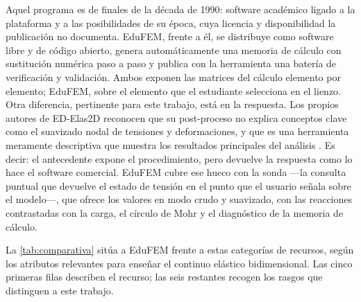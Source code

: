 Aquel programa es de finales de la década de 1990: software académico ligado a la plataforma y a las posibilidades de su época, cuya licencia y disponibilidad la publicación no documenta. EduFEM, frente a él, se distribuye como software libre y de código abierto, genera automáticamente una memoria de cálculo con sustitución numérica paso a paso y publica con la herramienta una batería de verificación y validación. Ambos exponen las matrices del cálculo elemento por elemento; EduFEM, sobre el elemento que el estudiante selecciona en el lienzo. Otra diferencia, pertinente para este trabajo, está en la respuesta. Los propios autores de ED-Elas2D reconocen que su post-proceso no explica conceptos clave como el suavizado nodal de tensiones y deformaciones, y que es una herramienta meramente descriptiva que muestra los resultados principales del análisis \autocite[p.~253]{suarez1998edelas2d}. Es decir: el antecedente expone el procedimiento, pero devuelve la respuesta como lo hace el software comercial. EduFEM cubre ese hueco con la sonda —la consulta puntual que devuelve el estado de tensión en el punto que el usuario señala sobre el modelo—, que ofrece los valores en modo crudo y suavizado, con las reacciones contrastadas con la carga, el círculo de Mohr y el diagnóstico de la memoria de cálculo.

La \autoref{tab:comparativa} sitúa a EduFEM frente a estas categorías de recursos, según los atributos relevantes para enseñar el continuo elástico bidimensional. Las cinco primeras filas describen el recurso; las seis restantes recogen los rasgos que distinguen a este trabajo.

